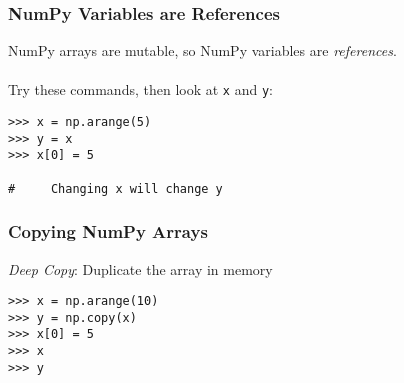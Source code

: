 \begin{frame}[fragile]\frametitle{NumPy Variables are References}

    NumPy arrays are mutable, so NumPy variables are \textit{references}.
    \\~\\
    Try these commands, then look at \lstinline|x| and \lstinline|y|:
    \begin{lstlisting}
>>> x = np.arange(5)
>>> y = x
>>> x[0] = 5

#     Changing x will change y
    \end{lstlisting}
\end{frame}

\begin{frame}[fragile]\frametitle{Copying NumPy Arrays}

    \textit{Deep Copy}: Duplicate the array in memory
    \begin{lstlisting}
>>> x = np.arange(10)
>>> y = np.copy(x)
>>> x[0] = 5
>>> x
>>> y
    \end{lstlisting}
\end{frame}

%



%

